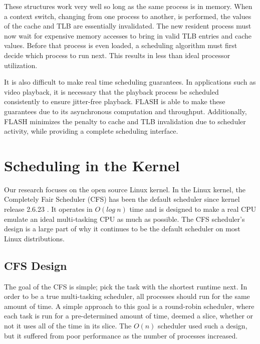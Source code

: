 \documentclass{sig-alternate-10pt}
\begin{document}
These structures work very well so long as the same process is in memory. When a context switch, changing from one process to another, is performed, the values of the cache and TLB are essentially invalidated. The new resident process must now wait for expensive memory accesses to bring in valid TLB entries and cache values. Before that process is even loaded, a scheduling algorithm must first decide which process to run next. This results in less than ideal processor utilization.

It is also difficult to make real time scheduling guarantees. In applications such as video playback, it is necessary that the playback process be scheduled consistently to ensure jitter-free playback. FLASH is able to make these guarantees due to its asynchronous computation and throughput. Additionally, FLASH minimizes the penalty to cache and TLB invalidation due to scheduler activity, while providing a complete scheduling interface.

\section{Scheduling in the Kernel}

Our research focuses on the open source Linux kernel. In the Linux kernel, the Completely Fair Scheduler (CFS) has been the default scheduler since kernel release 2.6.23 \cite{cfsdesign}. It operates in $ O(log\ n) $ time and is designed to make a real CPU emulate an ideal multi-tasking CPU as much as possible. The CFS scheduler's design is a large part of why it continues to be the default scheduler on most Linux distributions.

\subsection{CFS Design}
The goal of the CFS is simple; pick the task with the shortest runtime next. In order to be a true multi-tasking scheduler, all processes should run for the same amount of time. A simple approach to this goal is a round-robin scheduler, where each task is run for a pre-determined amount of time, deemed a slice, whether or not it uses all of the time in its slice. The $O(n)$ scheduler used such a design, but it suffered from poor performance as the number of processes increased.
\end{document}
